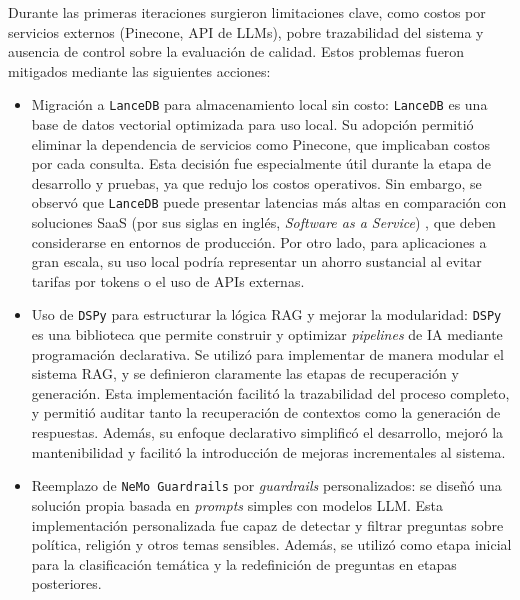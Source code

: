 Durante las primeras iteraciones surgieron limitaciones clave, como costos por servicios externos (Pinecone, API de LLMs), pobre trazabilidad del sistema y ausencia de control sobre la evaluación de calidad. Estos problemas fueron mitigados mediante las siguientes acciones:

\begin{itemize}
    \item Migración a \texttt{LanceDB} para almacenamiento local sin costo: \texttt{LanceDB} es una base de datos vectorial optimizada para uso local. Su adopción permitió eliminar la dependencia de servicios como Pinecone, que implicaban costos por cada consulta. Esta decisión fue especialmente útil durante la etapa de desarrollo y pruebas, ya que redujo los costos operativos. Sin embargo, se observó que \texttt{LanceDB} puede presentar latencias más altas en comparación con soluciones SaaS (por sus siglas en inglés, \textit{Software as a Service}) \citep{sas}, que deben considerarse en entornos de producción. Por otro lado, para aplicaciones a gran escala, su uso local podría representar un ahorro sustancial al evitar tarifas por tokens o el uso de APIs externas.

    \item Uso de \texttt{DSPy} para estructurar la lógica RAG y mejorar la modularidad: \texttt{DSPy} es una biblioteca que permite construir y optimizar \textit{pipelines} de IA mediante programación declarativa. Se utilizó para implementar de manera modular el sistema RAG, y se definieron claramente las etapas de recuperación y generación. Esta implementación facilitó la trazabilidad del proceso completo, y permitió auditar tanto la recuperación de contextos como la generación de respuestas. Además, su enfoque declarativo simplificó el desarrollo, mejoró la mantenibilidad y facilitó la introducción de mejoras incrementales al sistema.

    \item Reemplazo de \texttt{NeMo Guardrails} por \textit{guardrails} personalizados: se diseñó una solución propia basada en \textit{prompts} simples con modelos LLM. Esta implementación personalizada fue capaz de detectar y filtrar preguntas sobre política, religión y otros temas sensibles. Además, se utilizó como etapa inicial para la clasificación temática y la redefinición de preguntas en etapas posteriores.


\end{itemize}
